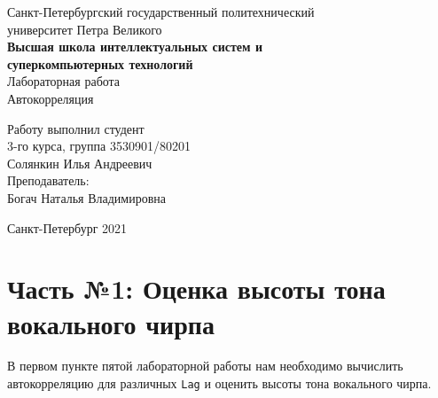 \documentclass[a4paper]{article}
\begin{document}
    \begin{center}
        \begin{center}
        \hfill \break
        \normalsize{Санкт-Петербургский государственный политехнический}\\
        \normalsize{университет Петра Великого}\\
        \hfill \break
        \normalsize{\textbf{Высшая школа интеллектуальных систем и}}\\ 
        \normalsize{\textbf{суперкомпьютерных технологий}}\\ 
        \hfill \break
        \hfill \break
        \hfill \break
        \normalsize{Лабораторная работа}\\
        \hfill \break
        \hfill \break
        \normalsize{\LARGE Автокорреляция}\\
        \end{center}
        \hfill \break
        \hfill \break
        \hfill \break
        \hfill \break
        \hfill \break
        \hfill \break
        \hfill \break
        \hfill \break
        \hfill \break
        \hfill \break
        \begin{flushright}
            \normalsize{Работу выполнил студент}\\
            \normalsize{3-го курса, группа 3530901/80201}\\
            \normalsize{Солянкин Илья Андреевич}\\
            \hfill \break
            \normalsize{Преподаватель:}\\
            \normalsize{Богач Наталья Владимировна}\\
        \end{flushright}
        \hfill \break
        \hfill \break
        \hfill \break
        \hfill \break
        \begin{center} Санкт-Петербург 2021 \end{center}
        \thispagestyle{empty}
    \end{center}
    
    \newpage
        \tableofcontents
    
    \newpage
         \listoffigures
    
    \newpage
         \lstlistoflistings   
     
    \newpage
        \section{Часть №1: Оценка высоты тона вокального чирпа}
            В первом пункте пятой лабораторной работы нам необходимо вычислить автокорреляцию для различных \texttt{Lag} и оценить высоты тона вокального чирпа.
            
\end{document}
